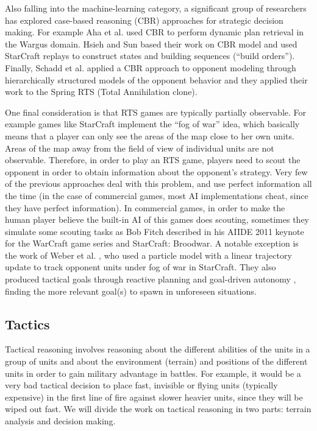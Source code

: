 \documentclass[journal]{IEEEtran}
\begin{document}
Also falling into the machine-learning category, a significant group of researchers has explored case-based reasoning (CBR) \cite{Aamodt94CBR} approaches for strategic decision making. For example Aha et al. \cite{LTW} used CBR to perform dynamic plan retrieval in the Wargus domain. Hsieh and Sun \cite{HsiehS08} based their work on \cite{LTW} CBR model and used StarCraft replays to construct states and building sequences (``build orders''). Finally, Schadd et al. \cite{SchaddBS07} applied a CBR approach to opponent modeling through hierarchically structured models of the opponent behavior and they applied their work to the Spring RTS (Total Annihilation clone).

One final consideration is that RTS games are typically partially observable. For example games like StarCraft implement the ``fog of war'' idea, which basically means that a player can only see the areas of the map close to her own units. Areas of the map away from the field of view of individual units are not observable. Therefore, in order to play an RTS game, players need to scout the opponent in order to obtain information about the opponent's strategy. Very few of the previous approaches deal with this problem, and use perfect information all the time (in the case of commercial games, most AI implementations cheat, since they have perfect information). In commercial games, in order to make the human player believe the built-in AI of this games does scouting, sometimes they simulate some scouting tasks as Bob Fitch described in his AIIDE 2011 keynote for the WarCraft game series and StarCraft: Broodwar. A notable exception is the work of Weber et al. \cite{WeberAIIDE11}, who used a particle model with a linear trajectory update to track opponent units under fog of war in StarCraft. They also produced tactical goals through reactive planning and goal-driven autonomy \cite{WeberCig10,Weber10}, finding the more relevant goal(s) to spawn in unforeseen situations. 


\subsection{Tactics}

Tactical reasoning involves reasoning about the different abilities of the units in a group of units and about the environment (terrain) and positions of the different units in order to gain military advantage in battles. For example, it would be a very bad tactical decision to place fast, invisible or flying units (typically expensive) in the first line of fire against slower heavier units, since they will be wiped out fast. We will divide the work on tactical reasoning in two parts: terrain analysis and decision making.
\end{document}
